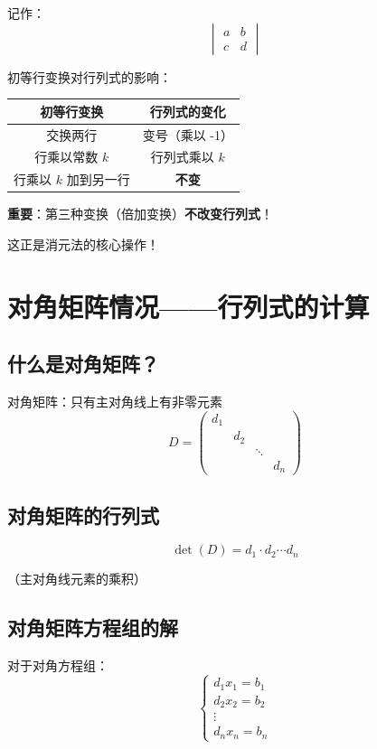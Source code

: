\documentclass[12pt,a4paper]{article}
\begin{document}
记作：
\[
\begin{vmatrix} a & b \\ c & d \end{vmatrix}
\]

初等行变换对行列式的影响：

\begin{center}
\begin{tabular}{|c|c|}
\hline
初等行变换 & 行列式的变化 \\
\hline
交换两行 & 变号（乘以 -1） \\
\hline
行乘以常数 $k$ & 行列式乘以 $k$ \\
\hline
行乘以 $k$ 加到另一行 & \textbf{不变} \\
\hline
\end{tabular}
\end{center}

\textbf{重要}：第三种变换（倍加变换）\textbf{不改变行列式}！

这正是消元法的核心操作！

\section{对角矩阵情况——行列式的计算}

\subsection{什么是对角矩阵？}

对角矩阵：只有主对角线上有非零元素
\[
D = \begin{pmatrix}
d_1 & & \\
& d_2 & \\
& & \ddots \\
& & & d_n
\end{pmatrix}
\]

\subsection{对角矩阵的行列式}

\[
\det(D) = d_1 \cdot d_2 \cdots d_n
\]

（主对角线元素的乘积）

\subsection{对角矩阵方程组的解}

对于对角方程组：
\[
\begin{cases}
d_1 x_1 = b_1 \\
d_2 x_2 = b_2 \\
\vdots \\
d_n x_n = b_n
\end{cases}
\]
\end{document}
